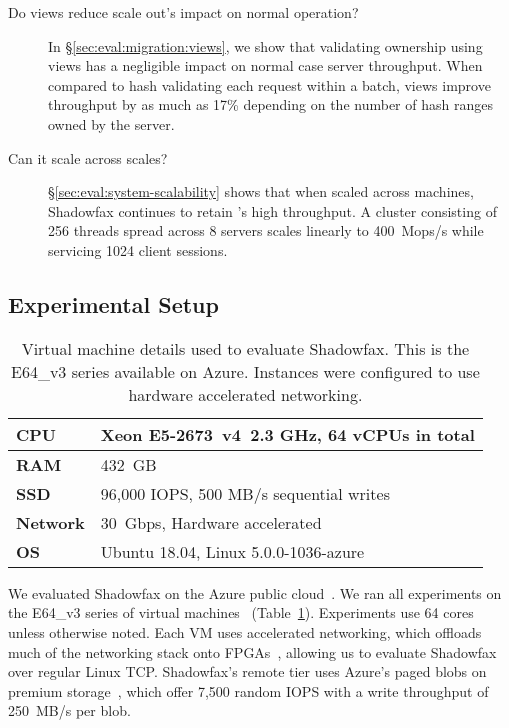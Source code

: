 \begin{description}
\item[Do views reduce scale out's impact on normal operation?]
  In \S\ref{sec:eval:migration:views}, we show that validating ownership
  using views has a negligible impact on normal case server throughput.
%
  When compared to hash validating each request within a batch, views
  improve throughput by as much as 17\% depending on the number of hash
  ranges owned by the server.

\item[Can it scale across scales?]
  \S\ref{sec:eval:system-scalability} shows that when scaled across
  machines, Shadowfax continues to retain \faster's high throughput.
%
  A cluster consisting of 256 threads spread across 8 servers scales
  linearly to 400~Mops/s while servicing 1024 client sessions.

\end{description}

%

\subsection{Experimental Setup}

\begin{table}[t]
\centering
\begin{tabular}{p{} p{}}
\toprule
\textbf{CPU} & Xeon E5-2673~v4~2.3 GHz, 64 vCPUs in total
\\
\midrule
\textbf{RAM} & 432~GB
\\
\midrule
\textbf{SSD} & 96,000 IOPS, 500 MB/s sequential writes
\\
\midrule
\textbf{Network} & 30~Gbps, Hardware accelerated
\\
\midrule
\textbf{OS} & Ubuntu 18.04, Linux 5.0.0-1036-azure
\\
\bottomrule
\end{tabular}
\caption{Virtual machine details used to evaluate Shadowfax. This is the
  E64\_v3 series available on Azure. Instances were configured to use
  hardware accelerated networking.}
\label{table:exptconfig}
\end{table}

We evaluated Shadowfax on the Azure public cloud~\cite{azure}.
%
We ran all experiments on the E64\_v3 series of virtual
machines~\cite{e64} (Table~\ref{table:exptconfig}).
%
Experiments use 64 cores unless otherwise noted.
%
Each VM uses accelerated networking, which offloads
much of the networking stack onto FPGAs~\cite{accel-nw}, allowing us to
evaluate Shadowfax over regular Linux TCP.
%
Shadowfax's remote tier uses Azure's paged blobs on premium
storage~\cite{page-blobs}, which offer 7,500 random IOPS with a write
throughput of 250~MB/s per blob.

